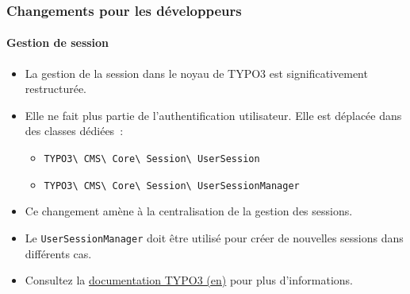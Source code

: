 %

\begin{frame}[fragile]
	\frametitle{Changements pour les développeurs}
	\framesubtitle{Gestion de session}

	\lstset{basicstyle=\tiny\ttfamily}

	\begin{itemize}
		\item La gestion de la session dans le noyau de TYPO3 est significativement restructurée.
		\item Elle ne fait plus partie de l'authentification utilisateur.
			Elle est déplacée dans des classes dédiées~:

			\begin{itemize}\small
				\item \texttt{TYPO3\textbackslash
					CMS\textbackslash
					Core\textbackslash
					Session\textbackslash
					UserSession}
				\item \texttt{TYPO3\textbackslash
					CMS\textbackslash
					Core\textbackslash
					Session\textbackslash
					UserSessionManager}
			\end{itemize}

		\item Ce changement amène à la centralisation de la gestion des sessions.
		\item Le \texttt{UserSessionManager} doit être utilisé pour créer de nouvelles sessions
			dans différents cas.
		\item Consultez la
			\href{https://docs.typo3.org/m/typo3/reference-coreapi/master/en-us/ApiOverview/SessionStorageFramework/Index.html}{documentation TYPO3 (en)}
			pour plus d'informations.
	\end{itemize}

\end{frame}


